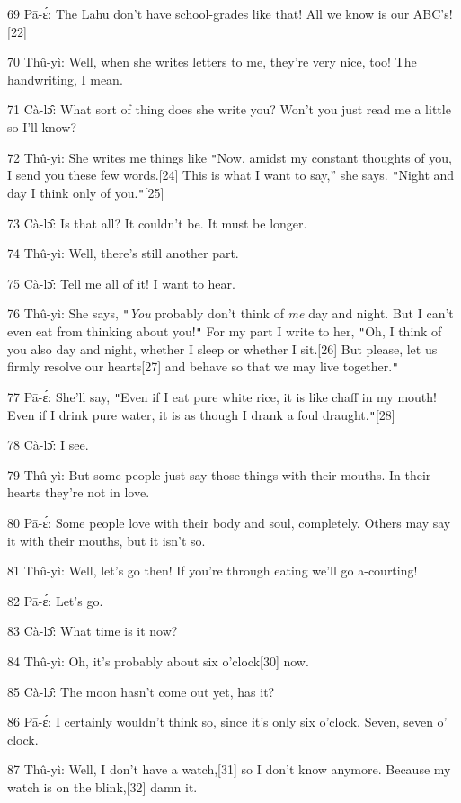 {69 Pā-ɛ́: The Lahu don't have school-grades like that! All we know
is our ABC's![22]}

{70 Thû-yì: Well, when she writes letters to me, they're very nice, too!
The handwriting, I mean.}

{71 Cà-lɔ̂: What sort of thing does she write you? Won't you just read
me a little so I'll know?}

{72 Thû-yì: She writes me things like \texttt{"}Now, amidst my constant
thoughts of you, I send you these few words.[24] This is what I want to say,''
she says. \texttt{"}Night and day I think only of you.\texttt{"}[25]}

{73 Cà-lɔ̂: Is that all? It couldn't be. It must be longer.}

{74 Thû-yì: Well, there's still another part.}

{75 Cà-lɔ̂: Tell me all of it! I want to hear.}

{76 Thû-yì: She says, \texttt{"}}{\textit{You}}{ probably
don't think of }{\textit{me}}{ day and night. But I can't even eat
from thinking about you!\texttt{"} For my part I write to her, \texttt{"}Oh, I
think of you also day and night, whether I sleep or whether I sit.[26] But please,
let us firmly resolve our hearts[27] and behave so that we may live together.\texttt{"}
}

{77 Pā-ɛ́: She'll say, \texttt{"}Even if I eat pure white rice, it is
like chaff in my mouth! Even if I drink pure water, it is as though I drank a foul
draught.\texttt{"}[28]}

{78 Cà-lɔ̂: I see.}

{79 Thû-yì: But some people just say those things with their mouths. In
their hearts they're not in love.}

{80 Pā-ɛ́: Some people love with their body and soul, completely. Others
may say it with their mouths, but it isn't so.}

{81 Thû-yì: Well, let's go then! If you're through eating we'll go a-courting!}

{82 Pā-ɛ́: Let's go.}

{83 Cà-lɔ̂: What time is it now?}

{84 Thû-yì: Oh, it's probably about}{\textit{ }}{six o'clock[30]
now.}

{85 Cà-lɔ̂: The moon hasn't come out yet, has it?}

{86 Pā-ɛ́: I certainly wouldn't think so, since it's only six o'clock.
Seven, seven o' clock. }

{87 Thû-yì: Well, I don't have a watch,[31] so I don't know anymore. Because
my watch is on the blink,[32] damn it.}

